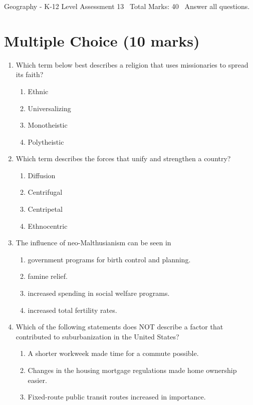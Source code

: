 \documentclass[12pt]{article}
\begin{document}
\begin{center}
Geography - K-12 Level Assessment 13 \
Total Marks: 40 \
Answer all questions.
\end{center}

\section*{Multiple Choice (10 marks)}
\begin{enumerate}[label=\arabic*.]
\item Which term below best describes a religion that uses missionaries to spread its faith?
\begin{enumerate}[label=(\alph*)]
    \item Ethnic
    \item Universalizing
    \item Monotheistic
    \item Polytheistic
\end{enumerate}
\item Which term describes the forces that unify and strengthen a country?
\begin{enumerate}[label=(\alph*)]
    \item Diffusion
    \item Centrifugal
    \item Centripetal
    \item Ethnocentric
\end{enumerate}
\item The influence of neo-Malthusianism can be seen in
\begin{enumerate}[label=(\alph*)]
    \item government programs for birth control and planning.
    \item famine relief.
    \item increased spending in social welfare programs.
    \item increased total fertility rates.
\end{enumerate}
\item Which of the following statements does NOT describe a factor that contributed to suburbanization in the United States?
\begin{enumerate}[label=(\alph*)]
    \item A shorter workweek made time for a commute possible.
    \item Changes in the housing mortgage regulations made home ownership easier.
    \item Fixed-route public transit routes increased in importance.

\end{enumerate}
\end{enumerate}
\end{document}
